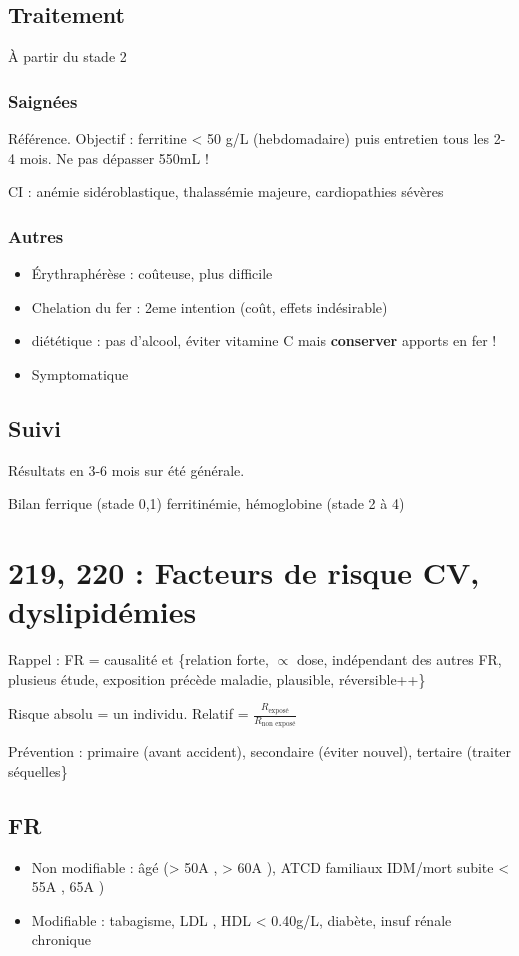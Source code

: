 \documentclass[11pt]{article}
\begin{document}
\subsection{Traitement}
\label{sec:org58a8028}
À partir du stade 2

\subsubsection{Saignées}
\label{sec:orge147e53}
Référence. Objectif : ferritine < 50 g/L (hebdomadaire) puis entretien tous les
  2-4 mois. Ne pas dépasser 550mL !

CI : anémie sidéroblastique, thalassémie majeure, cardiopathies sévères

\subsubsection{Autres}
\label{sec:org601c386}
\begin{itemize}
\item Érythraphérèse : coûteuse, plus difficile
\item Chelation du fer : 2eme intention (coût, effets indésirable)
\item diététique : pas d'alcool, éviter vitamine C mais \textbf{conserver} apports en fer !
\item Symptomatique
\end{itemize}

\subsection{Suivi}
\label{sec:org3d07958}
Résultats en 3-6 mois sur été générale. 

Bilan ferrique (stade 0,1) ferritinémie, hémoglobine (stade 2 à 4)

\section{219, 220 :  Facteurs de risque CV, dyslipidémies}
\label{sec:org8fa4f97}
Rappel : FR = causalité et \{relation forte, \(\propto\) dose, indépendant des autres
FR, plusieus étude, exposition précède maladie, plausible, réversible++\}

Risque absolu = un individu. Relatif = \(\frac{R_{\text{exposé}}}{R_{\text{non exposé}}}\)

Prévention : primaire (avant accident), secondaire (éviter nouvel), tertaire
(traiter séquelles\}

\subsection{FR}
\label{sec:orgdf1a419}
\begin{itemize}
\item Non modifiable : âgé (> 50A \male, > 60A \female), ATCD familiaux IDM/mort
subite < 55A \male, 65A \female)
\item Modifiable : tabagisme, LDL \inc, HDL < 0.40g/L, diabète, insuf rénale
chronique
\end{itemize}
\end{document}
